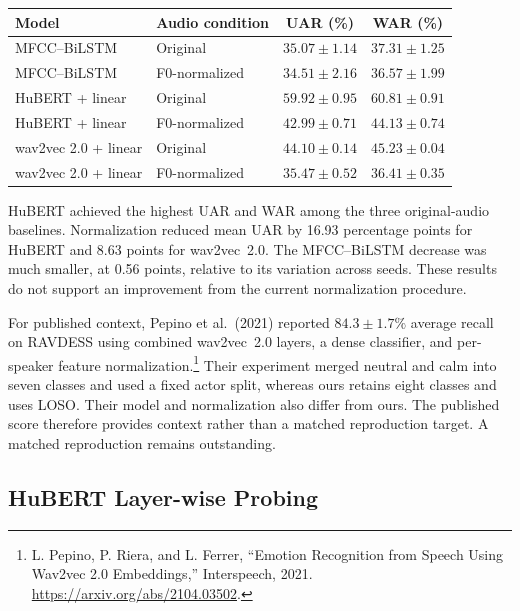 \documentclass[11pt, letterpaper]{article}
\begin{document}
\begin{center}
\small
\begin{tabular}{llcc}
\toprule
\textbf{Model} & \textbf{Audio condition} & \textbf{UAR (\%)} & \textbf{WAR (\%)} \\
\midrule
MFCC--BiLSTM & Original & $35.07 \pm 1.14$ & $37.31 \pm 1.25$ \\
MFCC--BiLSTM & F0-normalized & $34.51 \pm 2.16$ & $36.57 \pm 1.99$ \\
HuBERT + linear & Original & $59.92 \pm 0.95$ & $60.81 \pm 0.91$ \\
HuBERT + linear & F0-normalized & $42.99 \pm 0.71$ & $44.13 \pm 0.74$ \\
wav2vec 2.0 + linear & Original & $44.10 \pm 0.14$ & $45.23 \pm 0.04$ \\
wav2vec 2.0 + linear & F0-normalized & $35.47 \pm 0.52$ & $36.41 \pm 0.35$ \\
\bottomrule
\end{tabular}
\label{tab:midterm-baselines}
\end{center}

HuBERT achieved the highest UAR and WAR among the three original-audio baselines. Normalization reduced mean UAR by 16.93 percentage points for HuBERT and 8.63 points for wav2vec~2.0. The MFCC--BiLSTM decrease was much smaller, at 0.56 points, relative to its variation across seeds. These results do not support an improvement from the current normalization procedure.

For published context, Pepino et al.\ (2021) reported $84.3 \pm 1.7\%$ average recall on RAVDESS using combined wav2vec~2.0 layers, a dense classifier, and per-speaker feature normalization.\footnote{L. Pepino, P. Riera, and L. Ferrer, ``Emotion Recognition from Speech Using Wav2vec 2.0 Embeddings,'' Interspeech, 2021. \url{https://arxiv.org/abs/2104.03502}.} Their experiment merged neutral and calm into seven classes and used a fixed actor split, whereas ours retains eight classes and uses LOSO. Their model and normalization also differ from ours. The published score therefore provides context rather than a matched reproduction target. A matched reproduction remains outstanding.

\subsection{HuBERT Layer-wise Probing}
\end{document}
